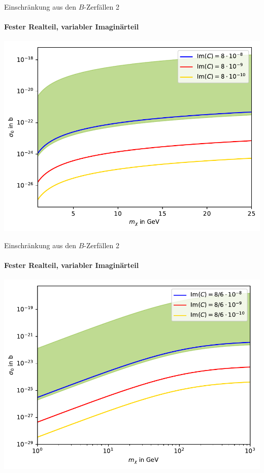 \begin{frame}{Einschränkung aus den $B$-Zerfällen 2}
\framesubtitle{Fester Realteil, variabler Imaginärteil}
\includegraphics[width=\textwidth]{Bilder/Im11.pdf}
\end{frame}
\begin{frame}[noframenumbering]{Einschränkung aus den $B$-Zerfällen 2}
\framesubtitle{Fester Realteil, variabler Imaginärteil}
\includegraphics[width=\textwidth]{Bilder/Im116.pdf}
\end{frame}


